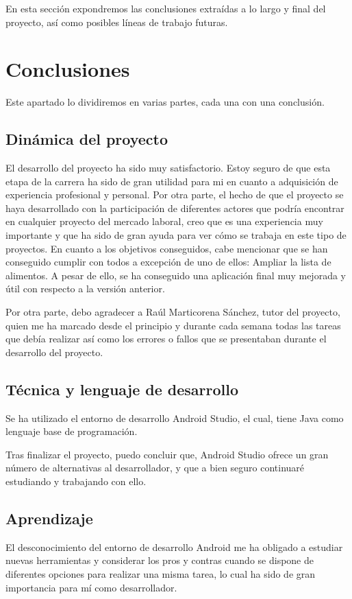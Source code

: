 
En esta sección expondremos las conclusiones extraídas a lo largo y final del proyecto, así como posibles líneas de trabajo futuras.
\section{Conclusiones}
Este apartado lo dividiremos en varias partes, cada una con una conclusión.
\subsection{Dinámica del proyecto}
El desarrollo del proyecto ha sido muy satisfactorio.  Estoy seguro de que esta etapa de la carrera ha sido de gran utilidad para mi en cuanto a adquisición de experiencia profesional y personal. 
Por otra parte, el hecho de que el proyecto se haya desarrollado con la participación de diferentes actores que podría encontrar en cualquier proyecto del mercado laboral, creo que es una experiencia muy importante y que ha sido de gran ayuda para ver cómo se trabaja en este tipo de proyectos. 
En cuanto a los objetivos conseguidos, cabe mencionar que se han conseguido cumplir con todos a excepción de uno de ellos: Ampliar la lista de alimentos. A pesar de ello, se ha conseguido una aplicación final muy mejorada y útil  con respecto a la versión anterior.

Por otra parte, debo agradecer a Raúl Marticorena Sánchez, tutor del proyecto, quien me ha marcado desde el principio y durante cada semana todas las tareas que debía realizar así como los errores o fallos que se presentaban durante el desarrollo del proyecto.
\subsection{Técnica y lenguaje de desarrollo}
Se ha utilizado el entorno de desarrollo Android Studio, el cual, tiene Java como lenguaje base de programación.

Tras finalizar el proyecto, puedo concluir que, Android Studio ofrece un gran número de alternativas al desarrollador, y que a bien seguro continuaré estudiando y trabajando con ello.

\subsection{Aprendizaje}
El desconocimiento del entorno de desarrollo Android me ha obligado a estudiar nuevas herramientas y considerar los pros y contras cuando se dispone de diferentes opciones para realizar una misma tarea, lo cual ha sido de gran importancia para mí como desarrollador.
